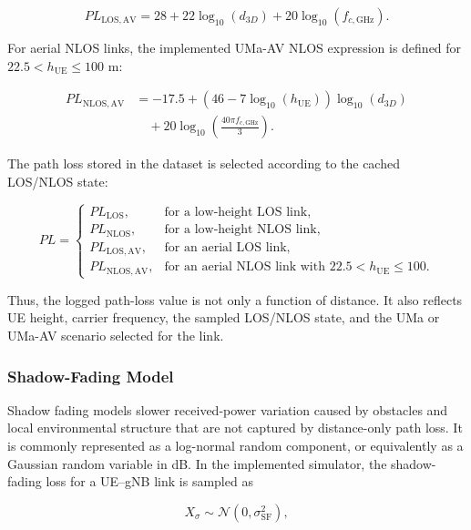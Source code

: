 \begin{equation}
    PL_{\mathrm{LOS,AV}} =
    28+22\log_{10}(d_{3D})
    +20\log_{10}(f_{c,\mathrm{GHz}}).
\end{equation}

For aerial NLOS links, the implemented UMa-AV NLOS expression is defined for \(22.5<h_{\mathrm{UE}}\le100\) m:

\begin{align}
    PL_{\mathrm{NLOS,AV}} &=
    -17.5+
    \left(46-7\log_{10}(h_{\mathrm{UE}})\right)
    \log_{10}(d_{3D}) \nonumber\\
    &\quad +20\log_{10}\left(
    \frac{40\pi f_{c,\mathrm{GHz}}}{3}
    \right).
\end{align}

The path loss stored in the dataset is selected according to the cached LOS/NLOS state:

\begin{equation}
PL =
\begin{cases}
PL_{\mathrm{LOS}}, & \text{for a low-height LOS link},\\
PL_{\mathrm{NLOS}}, & \text{for a low-height NLOS link},\\
PL_{\mathrm{LOS,AV}}, & \text{for an aerial LOS link},\\
PL_{\mathrm{NLOS,AV}}, & \text{for an aerial NLOS link with } 22.5<h_{\mathrm{UE}}\le100.
\end{cases}
\end{equation}

Thus, the logged path-loss value is not only a function of distance. It also reflects UE height, carrier frequency, the sampled LOS/NLOS state, and the UMa or UMa-AV scenario selected for the link.

\subsubsection{Shadow-Fading Model}

Shadow fading models slower received-power variation caused by obstacles and local environmental structure that are not captured by distance-only path loss. It is commonly represented as a log-normal random component, or equivalently as a Gaussian random variable in dB. In the implemented simulator, the shadow-fading loss for a UE--gNB link is sampled as

\begin{equation}
    X_{\sigma}\sim\mathcal{N}(0,\sigma_{\mathrm{SF}}^2),
\end{equation}

